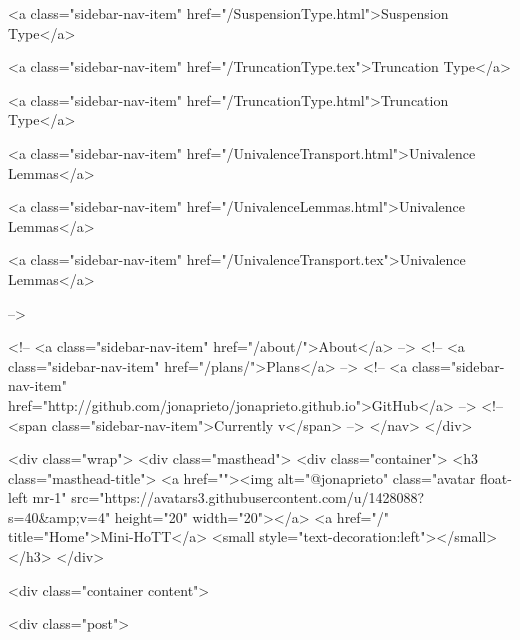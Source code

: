       
    
      
        
          <a class="sidebar-nav-item" href="/SuspensionType.html">Suspension Type</a>
        
      
    
      
        
          <a class="sidebar-nav-item" href="/TruncationType.tex">Truncation Type</a>
        
      
    
      
        
          <a class="sidebar-nav-item" href="/TruncationType.html">Truncation Type</a>
        
      
    
      
        
          <a class="sidebar-nav-item" href="/UnivalenceTransport.html">Univalence Lemmas</a>
        
      
    
      
        
          <a class="sidebar-nav-item" href="/UnivalenceLemmas.html">Univalence Lemmas</a>
        
      
    
      
        
          <a class="sidebar-nav-item" href="/UnivalenceTransport.tex">Univalence Lemmas</a>
        
      
     -->

    <!-- <a class="sidebar-nav-item" href="/about/">About</a> -->
    <!-- <a class="sidebar-nav-item" href="/plans/">Plans</a> -->
    <!-- <a class="sidebar-nav-item" href="http://github.com/jonaprieto/jonaprieto.github.io">GitHub</a> -->
    <!-- <span class="sidebar-nav-item">Currently v</span> -->
  </nav>
</div>

    <div class="wrap">
      <div class="masthead">
        <div class="container">
          <h3 class="masthead-title">
            <a href=""><img alt="@jonaprieto" class="avatar float-left mr-1" src="https://avatars3.githubusercontent.com/u/1428088?s=40&amp;v=4" height="20" width="20"></a>
            <a href="/" title="Home">Mini-HoTT</a>
            <small style="text-decoration:left"></small>
          </h3>
        </div>
      
      <div class="container content">
        







<div class="post">

